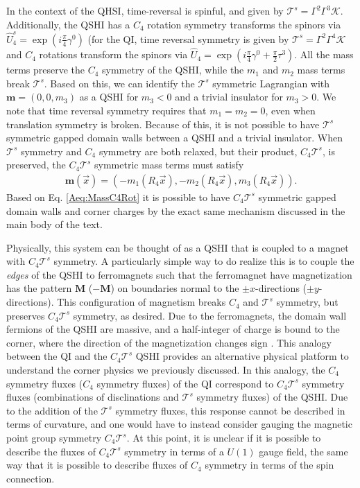 \documentclass[%
 reprint,
 amsmath,amssymb,
 aps,
]{revtex4-1}
\begin{document}
\begin{appendix}
In the context of the QHSI, time-reversal is spinful, and given by $\mathcal{T}^{s} = \Gamma^2\Gamma^3\mathcal{K}$. Additionally, the QSHI has a $C_4$ rotation symmetry transforms the spinors via $\hat{U}^s_4 = \exp(i \frac{\pi}{4} \gamma^0)$ (for the QI, time reversal symmetry is given by $\mathcal{T}^{s} = \Gamma^2\Gamma^4\mathcal{K}$ and $C_4$ rotations transform the spinors via $\hat{U}_4 = \exp(i \frac{\pi}{4} \gamma^0 + \frac{\pi}{2}\tau^3)$. All the mass terms preserve the $C_4$ symmetry of the QSHI, while the $m_1$ and $m_2$ mass terms break $\mathcal{T}^s$. Based on this, we can identify the $\mathcal{T}^s$ symmetric Lagrangian with $\bm{m} = (0,0,m_3)$ as a QSHI for $m_3<0$ and a trivial insulator for $m_3>0$. We note that time reversal symmetry requires that $m_1=m_2=0$, even when translation symmetry is broken. Because of this, it is not possible to have $\mathcal{T}^s$ symmetric gapped domain walls between a QSHI and a trivial insulator. When $\mathcal{T}^{s}$ symmetry and $C_4$ symmetry are both relaxed, but their product, $C_4 \mathcal{T}^{s}$, is preserved, the $C_4 \mathcal{T}^{s}$ symmetric mass terms must satisfy
\begin{equation}\begin{split}
\bm{m}(\vec{x})  = (-m_{1}(R_4\vec{x}),-m_{2}(R_4\vec{x}),m_{3}(R_4\vec{x})).\label{Aeq:MassC4Rot}\end{split}\end{equation}
Based on Eq. \ref{Aeq:MassC4Rot} it is possible to have $C_4 \mathcal{T}^{s}$ symmetric gapped domain walls and corner charges by the exact same mechanism discussed in the main body of the text. 


Physically, this system can be thought of as a QSHI that is coupled to a magnet with $C_4\mathcal{T}^s$ symmetry. A particularly simple way to do realize this is to couple the \textit{edges} of the QSHI to ferromagnets such that the ferromagnet have magnetization has the pattern $\bm{M}$ ($-\bm{M}$) on boundaries normal to the $\pm x$-directions ($\pm y$-directions). This configuration of magnetism breaks $C_4$ and $\mathcal{T}^s$ symmetry, but preserves $C_4\mathcal{T}^s$ symmetry, as desired. Due to the ferromagnets, the domain wall fermions of the QSHI are massive, and a half-integer of charge is bound to the corner, where the direction of the magnetization changes sign \cite{qi2008fractional,qi2008topological}. This analogy between the QI and the $C_4 \mathcal{T}^s$ QSHI provides an alternative physical platform to understand the corner physics we previously discussed. In this analogy, the $C_4$ symmetry fluxes ($C_4$ symmetry fluxes) of the QI correspond to $C_4 \mathcal{T}^{s}$ symmetry fluxes (combinations of disclinations and $\mathcal{T}^s$ symmetry fluxes) of the QSHI. Due to the addition of the $\mathcal{T}^{s}$ symmetry fluxes, this response cannot be described in terms of curvature, and one would have to instead consider gauging the magnetic point group symmetry $C_4 \mathcal{T}^{s}$. At this point, it is unclear if it is possible to describe the fluxes of $C_4 \mathcal{T}^{s}$ symmetry in terms of a $U(1)$ gauge field, the same way that it is possible to describe fluxes of $C_4$ symmetry in terms of the spin connection. 



\end{appendix}
\end{document}
